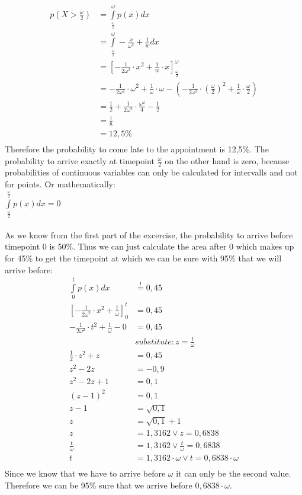 \begin{align*}
  p(X > \frac{\omega}{2}) &= \int\limits_{\frac{\omega}{2}}^{\omega} p(x) dx \\
  &= \int\limits_{\frac{\omega}{2}}^{\omega} -\frac{x}{\omega^2} + \frac{1}{w} dx \\
  &= [-\frac{1}{2\omega^2}\cdot x^2 + \frac{1}{w}\cdot x]_{\frac{\omega}{2}}^{\omega} \\
  &= -\frac{1}{2\omega^2}\cdot \omega^2 + \frac{1}{\omega}\cdot \omega - (-\frac{1}{2\omega^2}\cdot (\frac{\omega}{2})^2 + \frac{1}{\omega}\cdot \frac{\omega}{2}) \\
  &= \frac{1}{2} + \frac{1}{2\omega^2}\cdot\frac{\omega^2}{4} - \frac{1}{2}\\
  &= \frac{1}{8}\\
  &= 12,5\% \\
\end{align*}
Therefore the probability to come late to the appointment is 12,5\%.
The probability to arrive exactly at timepoint $\frac{\omega}{2}$ on the other hand is zero, because probabilities of continuous variables can only be calculated for intervalls and not for points. Or mathematically:\\
$\int\limits_{\frac{\omega}{2}}^{\frac{\omega}{2}} p(x)dx = 0$
\\
\\
As we know from the first part of the excercise, the probability to arrive before timepoint 0 is 50\%. Thus we can just calculate the area after 0 which makes up for 45\% to get the timepoint at which we can be sure with 95\%  that we will arrive before: \\
\begin{align*}
  \int\limits_{0}^{t} p(x)dx &\stackrel{!}{=} 0,45\\
  [-\frac{1}{2\omega^2}\cdot x^2 + \frac{1}{\omega}]_0^t & = 0,45   \\
  -\frac{1}{2\omega^2}\cdot t^2 + \frac{1}{\omega} - 0 &= 0,45   \\
 & substitute: z=\frac{t}{\omega}\\
  \frac{1}{2}\cdot z^2 + z &= 0,45\\
  z^2 - 2z &= -0,9\\
  z^2 - 2z + 1 &= 0,1\\
  (z-1)^2 &= 0,1\\
  z-1 &= \sqrt{0,1}\\
  z &= \sqrt{0,1} + 1\\
  z &= 1,3162 \vee  z = 0,6838\\
  \frac{t}{\omega} &= 1,3162 \vee  \frac{t}{\omega} = 0,6838\\
  t &= 1,3162\cdot \omega \vee t  = 0,6838\cdot \omega\\
\end{align*}
  Since we know that we have to arrive before $\omega$ it can only be the second value. Therefore we can be 95\% sure that we arrive before $0,6838 \cdot \omega$.

